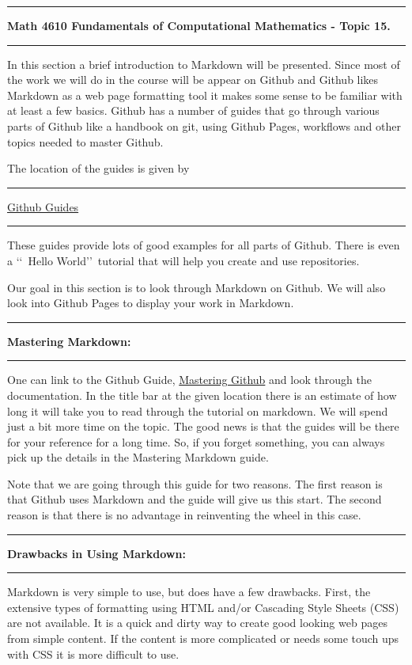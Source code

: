 \documentclass[10pt,fleqn]{article}
\begin{document}
\vskip0.1in\hrule\vskip0.1in \noindent
{\bf Math 4610 Fundamentals of Computational Mathematics  - Topic 15.}
\vskip0.1in\hrule\vskip0.1in \noindent
In this section a brief introduction to Markdown will be presented. Since most
of the work we will do in the course will be appear on Github and Github likes
Markdown as a web page formatting tool it makes some sense to be familiar with
at least a few basics. Github has a number of guides that go through various
parts of Github like a handbook on git, using Github Pages, workflows and other
topics needed to master Github.

The location of the guides is given by
\vskip0.1in\hrule\vskip0.1in \noindent
\href{https://guides.github.com}{Github Guides}
\vskip0.1in\hrule\vskip0.1in \noindent
These guides provide lots of good examples for all parts of Github. There is
even a \lq\lq\ Hello World\rq\rq\ tutorial that will help you create and use
repositories.

Our goal in this section is to look through Markdown on Github. We will also
look into Github Pages to display your work in Markdown.
\vskip0.1in\hrule\vskip0.1in \noindent
{\bf Mastering Markdown:}
\vskip0.1in\hrule\vskip0.1in \noindent
One can link to the Github Guide,
\href{https://guides.github.com/features/mastering-markdown/}{Mastering Github}
and look through the documentation. In the title bar at the given location there
is an estimate of how long it will take you to read through the tutorial on
markdown. We will spend just a bit more time on the topic. The good news is that
the guides will be there for your reference for a long time. So, if you forget
something, you can always pick up the details in the Mastering Markdown guide.

Note that we are going through this guide for two reasons. The first reason is
that Github uses Markdown and the guide will give us this start. The second
reason is that there is no advantage in reinventing the wheel in this case.
\vskip0.1in\hrule\vskip0.1in \noindent
{\bf Drawbacks in Using Markdown:}
\vskip0.1in\hrule\vskip0.1in \noindent
Markdown is very simple to use, but does have a few drawbacks. First, the
extensive types of formatting using HTML and/or Cascading Style Sheets (CSS) are
not available. It is a quick and dirty way to create good looking web pages from
simple content. If the content is more complicated or needs some touch ups with
CSS it is more difficult to use.
\end{document}
